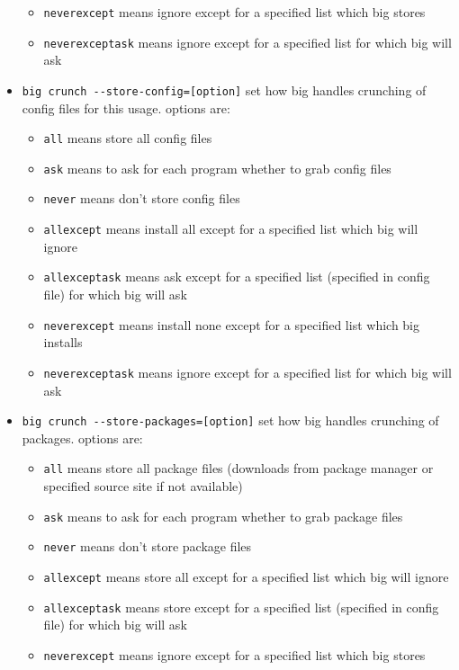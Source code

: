 \documentclass[12pt]{article}
\begin{document}
\begin{itemize}
\begin{itemize}
                \item \verb+neverexcept+ means ignore except for a specified list which big stores
                \item \verb+neverexceptask+ means ignore except for a specified list for which big will ask
            \end{itemize}
            \item \verb+big crunch --store-config=[option]+ set how big handles crunching of config files for this usage.  options are: \begin{itemize}
                \item \verb+all+ means store all config files
                \item \verb+ask+ means to ask for each program whether to grab config files
                \item \verb+never+ means don't store config files
                \item \verb+allexcept+ means install all except for a specified list which big will ignore
                \item \verb+allexceptask+ means ask except for a specified list (specified in config file) for which big will ask
                \item \verb+neverexcept+ means install none except for a specified list which big installs
                \item \verb+neverexceptask+ means ignore except for a specified list for which big will ask
            \end{itemize}
            \item \verb+big crunch --store-packages=[option]+ set how big handles crunching of packages.  options are: \begin{itemize}
                \item \verb+all+ means store all package files (downloads from package manager or specified source site if not available)
                \item \verb+ask+ means to ask for each program whether to grab package files 
                \item \verb+never+ means don't store package files
                \item \verb+allexcept+ means store all except for a specified list which big will ignore
                \item \verb+allexceptask+ means store except for a specified list (specified in config file) for which big will ask
                \item \verb+neverexcept+ means ignore except for a specified list which big stores

\end{itemize}
\end{itemize}
\end{document}
